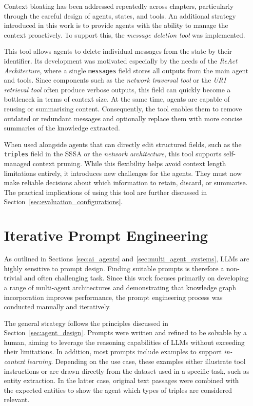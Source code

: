 \documentclass[a4paper,oneside,bibliography=totoc]{scrbook}
\begin{document}
Context bloating has been addressed repeatedly across chapters, particularly through the careful design of agents, states, and tools. An additional strategy introduced in this work is to provide agents with the ability to manage the context proactively. To support this, the \textit{message deletion tool} was implemented.

This tool allows agents to delete individual messages from the state by their identifier. Its development was motivated especially by the needs of the \textit{ReAct Architecture}, where a single \texttt{messages} field stores all outputs from the main agent and tools. Since components such as the \textit{network traversal tool} or the \textit{URI retrieval tool} often produce verbose outputs, this field can quickly become a bottleneck in terms of context size. At the same time, agents are capable of reusing or summarising content. Consequently, the tool enables them to remove outdated or redundant messages and optionally replace them with more concise summaries of the knowledge extracted.

When used alongside agents that can directly edit structured fields, such as the \texttt{triples} field in the \ac{SSSA} or the \textit{network architecture}, this tool supports self-managed context pruning. While this flexibility helps avoid context length limitations entirely, it introduces new challenges for the agents. They must now make reliable decisions about which information to retain, discard, or summarise. The practical implications of using this tool are further discussed in Section~\ref{sec:evaluation_configurations}.

\section{Iterative Prompt Engineering}
\label{sec:iterative_prompt_engineering}

As outlined in Sections~\ref{sec:ai_agents} and~\ref{sec:multi_agent_systems}, \acp{LLM} are highly sensitive to prompt design. Finding suitable prompts is therefore a non-trivial and often challenging task. Since this work focuses primarily on developing a range of multi-agent architectures and demonstrating that knowledge graph incorporation improves performance, the prompt engineering process was conducted manually and iteratively.

The general strategy follows the principles discussed in Section~\ref{sec:agent_design}. Prompts were written and refined to be solvable by a human, aiming to leverage the reasoning capabilities of \acp{LLM} without exceeding their limitations. In addition, most prompts include examples to support \textit{in-context learning}. Depending on the use case, these examples either illustrate tool instructions or are drawn directly from the dataset used in a specific task, such as entity extraction. In the latter case, original text passages were combined with the expected entities to show the agent which types of triples are considered relevant.
\end{document}
